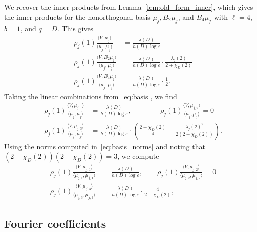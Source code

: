 \documentclass[11pt,reqno,oneside]{amsart}
\theoremstyle{plain}
\theoremstyle{definition}
\begin{document}
We recover the inner products from Lemma~\ref{lem:old_form_inner}, which gives
the inner products for the nonorthogonal basis $\mu_j, B_2 \mu_j$, and $B_4
  \mu_j$ with $\ell = 4$, $b = 1$, and $q = D$.
This gives
\begin{align*}
  \rho_j(1)
  \frac{\langle V, \mu_j \rangle}{\langle \mu_j, \mu_j \rangle}     & = \frac{\lambda(D)}{h(D) \log \varepsilon}                                          \\
  \rho_j(1)
  \frac{\langle V, B_2 \mu_j \rangle}{\langle \mu_j, \mu_j \rangle} & = \frac{\lambda(D)}{h(D) \log \varepsilon} \cdot \frac{\lambda_j(2)}{2 + \chi_D(2)} \\
  \rho_j(1)
  \frac{\langle V, B_4 \mu_j \rangle}{\langle \mu_j, \mu_j \rangle} & = \frac{\lambda(D)}{h(D) \log \varepsilon} \cdot \frac{1}{2}.
\end{align*}
Taking the linear combinations from~\eqref{eq:basis}, we find
\begin{align*}
  \rho_j(1)
  \frac{\langle V, \mu_{j,1} \rangle}{\langle \mu_j, \mu_j \rangle}
   & =
  \frac{\lambda(D)}{h(D) \log \varepsilon},
  \qquad \qquad
  \rho_j(1)
  \frac{\langle V, \mu_{j,2} \rangle}{\langle \mu_j, \mu_j \rangle}
  =
  0
  \\
  \rho_j(1)
  \frac{\langle V, \mu_{j,3} \rangle}{\langle \mu_j, \mu_j \rangle}
   & =
  \frac{\lambda(D)}{h(D) \log \varepsilon}
  \cdot
  \left(\frac{2+\chi_D(2)}{4} - \frac{\lambda_j(2)^2}{2(2+\chi_D(2))} \right).
\end{align*}
Using the norms computed in~\eqref{eq:basis_norms} and noting that $(2 + \chi_D(2))(2
  - \chi_D(2)) = 3$, we compute
\begin{equation}
  \begin{split}\label{eq:orthog_inner_products}
    \rho_j(1)
    \frac{\langle V, \mu_{j,1} \rangle}{\langle \mu_{j,1}, \mu_{j,1}
    \rangle}                                                                  & = \frac{\lambda(D)}{h(D) \log \varepsilon}, \qquad
    \rho_j(1)
    \frac{\langle V, \mu_{j,2} \rangle}{\langle \mu_{j,2}, \mu_{j,2} \rangle} = 0                                                                         \\
    \rho_j(1)
    \frac{\langle V, \mu_{j,3} \rangle}{\langle \mu_{j,3}, \mu_{j,3} \rangle} & = \frac{\lambda(D)}{h(D) \log \varepsilon} \cdot \frac{4}{2 - \chi_D(2)},
  \end{split}
\end{equation}


\subsection{Fourier coefficients}
\end{document}
